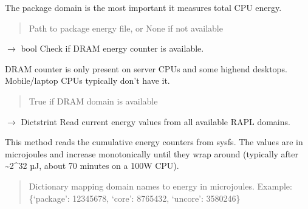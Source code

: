 \documentclass[letterpaper,10pt,english]{sphinxmanual}
\begin{document}
\begin{fulllineitems}
\begin{fulllineitems}
\sphinxAtStartPar
The package domain is the most important \textendash{} it measures total CPU energy.
\begin{quote}\begin{description}
\sphinxAtStartPar
Path to package energy file, or None if not available

\end{description}\end{quote}

\end{fulllineitems}


\begin{fulllineitems}
\label{\detokenize{core.readers.rapl_reader:core.readers.rapl_reader.RAPLReader.has_dram}}
\pysigstartsignatures
\pysiglinewithargsret
{}
{}
{{ $\rightarrow$ bool}}
\pysigstopsignatures
\sphinxAtStartPar
Check if DRAM energy counter is available.

\sphinxAtStartPar
DRAM counter is only present on server CPUs and some high\sphinxhyphen{}end desktops.
Mobile/laptop CPUs typically don’t have it.
\begin{quote}\begin{description}
\sphinxAtStartPar
True if DRAM domain is available

\end{description}\end{quote}

\end{fulllineitems}


\begin{fulllineitems}
\label{\detokenize{core.readers.rapl_reader:core.readers.rapl_reader.RAPLReader.read_energy}}
\pysigstartsignatures
\pysiglinewithargsret
{}
{}
{{ $\rightarrow$ Dict\DUrole{p}{{[}}strint\DUrole{p}{{]}}}}
\pysigstopsignatures
\sphinxAtStartPar
Read current energy values from all available RAPL domains.

\sphinxAtStartPar
This method reads the cumulative energy counters from sysfs.
The values are in microjoules and increase monotonically until
they wrap around (typically after \textasciitilde{}2\textasciicircum{}32 µJ, about 70 minutes on a 100W CPU).
\begin{quote}\begin{description}
\sphinxAtStartPar
Dictionary mapping domain names to energy in microjoules.
Example: \{‘package’: 12345678, ‘core’: 8765432, ‘uncore’: 3580246\}


\end{description}
\end{quote}
\end{fulllineitems}
\end{fulllineitems}
\end{document}
